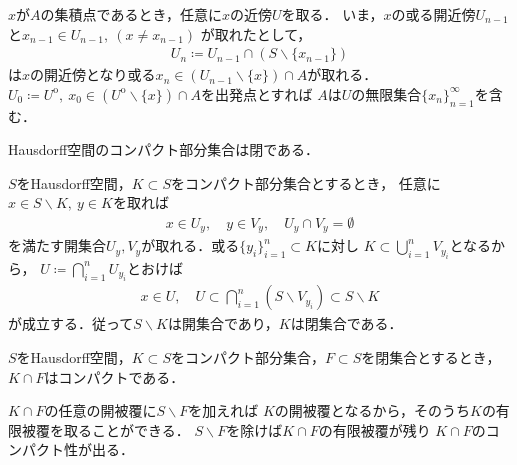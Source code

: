 	\begin{prf}
		$x$が$A$の集積点であるとき，任意に$x$の近傍$U$を取る．
		いま，$x$の或る開近傍$U_{n-1}$と$x_{n-1} \in U_{n-1},\ (x \neq x_{n-1})$
		が取れたとして，
		\begin{align}
			U_n \coloneqq U_{n-1} \cap (S \backslash \{x_{n-1}\})
		\end{align}
		は$x$の開近傍となり或る$x_n \in (U_{n-1} \backslash \{x\}) \cap A$が取れる．
		$U_0 \coloneqq U^{\mathrm{o}},\ 
		x_0 \in (U^{\mathrm{o}} \backslash \{x\}) \cap A$を出発点とすれば
		$A$は$U$の無限集合$\{x_n\}_{n=1}^\infty$を含む．
	\end{prf}
	
	\begin{screen}
		\begin{thm}[Hausdorff空間のコンパクト部分集合は閉]
			Hausdorff空間のコンパクト部分集合は閉である．
		\end{thm}
	\end{screen}
	
	\begin{prf}
		$S$をHausdorff空間，$K \subset S$をコンパクト部分集合とするとき，
		任意に$x \in S \backslash K,\ y \in K$を取れば
		\begin{align}
			x \in U_y,\quad y \in V_y, \quad U_y \cap V_y = \emptyset
		\end{align}
		を満たす開集合$U_y,V_y$が取れる．或る$\{y_i\}_{i=1}^n \subset K$に対し
		$K \subset \bigcup_{i=1}^n V_{y_i}$となるから，
		$U \coloneqq \bigcap_{i=1}^n U_{y_i}$とおけば
		\begin{align}
			x \in U,\quad U \subset \bigcap_{i=1}^n \left(S\backslash V_{y_i}\right)
			\subset S \backslash K
		\end{align}
		が成立する．従って$S \backslash K$は開集合であり，$K$は閉集合である．
		\QED
	\end{prf}
	
	\begin{screen}
		\begin{thm}[Hausdorff空間においてコンパクト集合の閉部分集合はコンパクト]
			$S$をHausdorff空間，$K \subset S$をコンパクト部分集合，$F \subset S$を閉集合とするとき，
			$K \cap F$はコンパクトである．
		\end{thm}
	\end{screen}
	
	\begin{prf}
		$K \cap F$の任意の開被覆に$S \backslash F$を加えれば
		$K$の開被覆となるから，そのうち$K$の有限被覆を取ることができる．
		$S \backslash F$を除けば$K \cap F$の有限被覆が残り
		$K \cap F$のコンパクト性が出る．
		\QED
	\end{prf}
	
